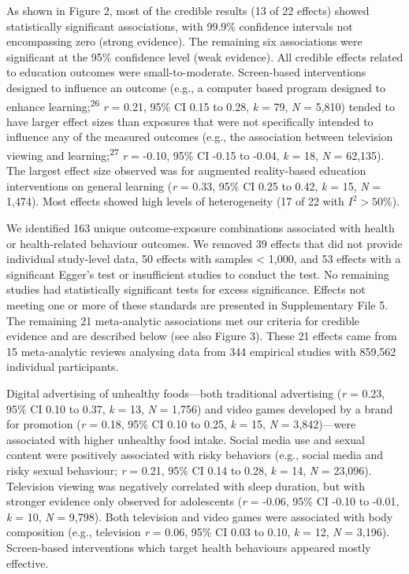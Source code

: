 \documentclass[
  english,
  man]{apa6}
\begin{document}
As shown in Figure 2, most of the credible results (13 of 22 effects) showed statistically significant associations, with 99.9\% confidence intervals not encompassing zero (strong evidence).
The remaining six associations were significant at the 95\% confidence level (weak evidence).
All credible effects related to education outcomes were small-to-moderate.
Screen-based interventions designed to influence an outcome (e.g., a computer based program designed to enhance learning;\textsuperscript{26} \emph{r} = 0.21, 95\% CI 0.15 to 0.28, \emph{k} = 79, \emph{N} = 5,810) tended to have larger effect sizes than exposures that were not specifically intended to influence any of the measured outcomes (e.g., the association between television viewing and learning;\textsuperscript{27} \emph{r} = -0.10, 95\% CI -0.15 to -0.04, \emph{k} = 18, \emph{N} = 62,135).
The largest effect size observed was for augmented reality-based education interventions on general learning (\emph{r} = 0.33, 95\% CI 0.25 to 0.42, \emph{k} = 15, \emph{N} = 1,474).
Most effects showed high levels of heterogeneity (17 of 22 with \(I^2 > 50\%\)).

We identified 163 unique outcome-exposure combinations associated with health or health-related behaviour outcomes.
We removed 39 effects that did not provide individual study-level data, 50 effects with samples \textless{} 1,000, and 53 effects with a significant Egger's test or insufficient studies to conduct the test.
No remaining studies had statistically significant tests for excess significance.
Effects not meeting one or more of these standards are presented in Supplementary File 5.
The remaining 21 meta-analytic associations met our criteria for credible evidence and are described below (see also Figure 3).
These 21 effects came from 15 meta-analytic reviews analysing data from 344 empirical studies with 859,562 individual participants.

Digital advertising of unhealthy foods---both traditional advertising (\emph{r} = 0.23, 95\% CI 0.10 to 0.37, \emph{k} = 13, \emph{N} = 1,756) and video games developed by a brand for promotion (\emph{r} = 0.18, 95\% CI 0.10 to 0.25, \emph{k} = 15, \emph{N} = 3,842)---were associated with higher unhealthy food intake.
Social media use and sexual content were positively associated with risky behaviors (e.g., social media and risky sexual behaviour; \emph{r} = 0.21, 95\% CI 0.14 to 0.28, \emph{k} = 14, \emph{N} = 23,096).
Television viewing was negatively correlated with sleep duration, but with stronger evidence only observed for adolescents (\emph{r} = -0.06, 95\% CI -0.10 to -0.01, \emph{k} = 10, \emph{N} = 9,798).
Both television and video games were associated with body composition (e.g., television \emph{r} = 0.06, 95\% CI 0.03 to 0.10, \emph{k} = 12, \emph{N} = 3,196).
Screen-based interventions which target health behaviours appeared mostly effective.
\end{document}
